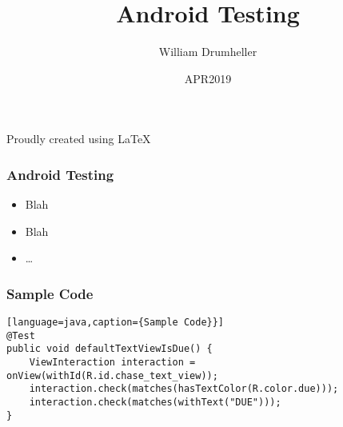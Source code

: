 \documentclass[10pt]{beamer}
\title{Android Testing}
\author{William Drumheller}
\date{APR2019}
\begin{document}
\begin{frame}
\titlepage
\begin{center}
Proudly created using \LaTeX
\end{center}
\end{frame}

\begin{frame}
\frametitle{Android Testing}
\begin{itemize}
    \item Blah
    \item Blah
    \item \dots
\end{itemize}
\end{frame}

\begin{frame}[fragile]
\frametitle{Sample Code}
\begin{lstlisting}[language=java,caption={Sample Code}}]
@Test
public void defaultTextViewIsDue() {
    ViewInteraction interaction = onView(withId(R.id.chase_text_view));
    interaction.check(matches(hasTextColor(R.color.due)));
    interaction.check(matches(withText("DUE")));
}
\end{lstlisting}
\end{frame}
\end{document}
